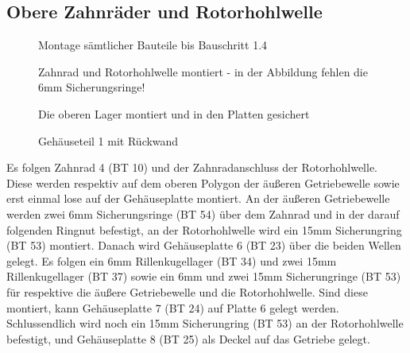 \documentclass[10pt, a4paper]{article}
\newcommand{\CaptSpac}{-10pt}
\begin{document}
\subsection{Obere Zahnräder und Rotorhohlwelle}
\begin{wrapfigure}{r}{0.31\textwidth}
  \vspace{-10pt}
  \vspace{\CaptSpac}
  \caption{\label{fig:Bauschritt5}Montage sämtlicher Bauteile bis Bauschritt 1.4}
  \vspace{\CaptSpac}
  \caption{\label{fig:Bauschritt6}Zahnrad und Rotorhohlwelle montiert - in der Abbildung fehlen die 6mm Sicherungsringe!}
  \vspace{\CaptSpac}
  \caption{\label{fig:Bauschritt7}Die oberen Lager montiert und in den Platten gesichert} 
  \vspace{\CaptSpac}
  \caption{\label{fig:Case}Gehäuseteil 1 mit Rückwand}
  \vspace{-10pt}
\end{wrapfigure}
Es folgen Zahnrad 4 (BT 10) und der Zahnradanschluss der Rotorhohlwelle. Diese werden respektiv auf dem oberen Polygon der äußeren Getriebewelle sowie erst einmal lose auf der Gehäuseplatte montiert. An der äußeren Getriebewelle werden zwei 6mm Sicherungsringe (BT 54) über dem Zahnrad und in der darauf folgenden Ringnut befestigt, an der Rotorhohlwelle wird ein 15mm Sicherungring (BT 53) montiert. Danach wird Gehäuseplatte 6 (BT 23) über die beiden Wellen gelegt. Es folgen ein 6mm Rillenkugellager (BT 34) und zwei 15mm Rillenkugellager (BT 37) sowie ein 6mm und zwei 15mm Sicherungringe (BT 53) für respektive die äußere Getriebewelle und die Rotorhohlwelle. Sind diese montiert, kann Gehäuseplatte 7 (BT 24) auf Platte 6 gelegt werden. Schlussendlich wird noch ein 15mm Sicherungring (BT 53) an der Rotorhohlwelle befestigt, und Gehäuseplatte 8 (BT 25) als Deckel auf das Getriebe gelegt. 
\end{document}
